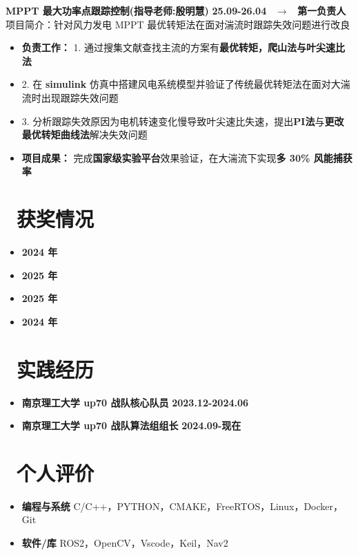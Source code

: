 \documentclass[11pt, a4paper]{article}
\begin{document}
\vspace{3pt}
\textbf{MPPT 最大功率点跟踪控制(指导老师:殷明慧)} \hfill \textbf{25.09-26.04} \ $\rightarrow$ \ \textbf{第一负责人} \\
{\kaishu 项目简介：针对风力发电 MPPT 最优转矩法在面对湍流时跟踪失效问题进行改良}
\begin{itemize}[leftmargin=1.5em, noitemsep, topsep=1pt]
    \item \textbf{负责工作：} 1. 通过搜集文献查找主流的方案有\textbf{最优转矩，爬山法与叶尖速比法}
    \item 2. 在 \textbf{simulink} 仿真中搭建风电系统模型并验证了传统最优转矩法在面对大湍流时出现跟踪失效问题
    \item 3. 分析跟踪失效原因为电机转速变化慢导致叶尖速比失速，提出\textbf{PI法}与\textbf{更改最优转矩曲线法}解决失效问题
    \item \textbf{项目成果：} 完成\textbf{国家级实验平台}效果验证，在大湍流下实现\textbf{多 30\% 风能捕获率}
\end{itemize}

\section{\faTrophy \ 获奖情况}
\begin{itemize}[leftmargin=1.5em, nosep, topsep=2pt]
    \item {}  \hfill \textbf{2024 年}
    \item {}  \hfill \textbf{2025 年}
    \item {}  \hfill \textbf{2025 年}
    \item {}  \hfill \textbf{2024 年}
\end{itemize}

\section{\faBriefcase \ 实践经历}
\begin{itemize}[leftmargin=1.5em, nosep, topsep=2pt]
    \item \textbf{南京理工大学 up70 战队核心队员} \hfill \textbf{2023.12-2024.06}
    \item \textbf{南京理工大学 up70 战队算法组组长} \hfill \textbf{2024.09-现在} 
\end{itemize}

\section{\faUserCheck \ 个人评价}
\begin{itemize}[leftmargin=1.5em, nosep, topsep=2pt]
    \item \textbf{编程与系统} C/C++，PYTHON，CMAKE，FreeRTOS，Linux，Docker，Git
    \item \textbf{软件/库} ROS2，OpenCV，Vscode，Keil，Nav2
\end{itemize}
\end{document}
